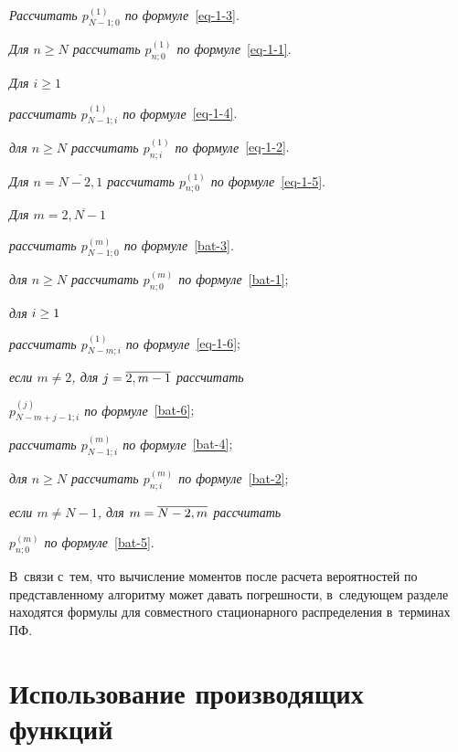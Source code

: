 \begin{multicols}{2}
\noindent
\textit{Рассчитать $p^{(1)}_{N-1;0}$ по формуле}~\eqref{eq-1-3}.

\noindent
\textit{Для $n\ge N$ рассчитать $p^{(1)}_{n;0}$ по
формуле}~\eqref{eq-1-1}.

\noindent
\textit{Для $i\ge1$}


\textit{рассчитать $p^{(1)}_{N-1;i}$ по формуле}~\eqref{eq-1-4}.

\textit{для $n\ge N$ рассчитать $p^{(1)}_{n;i}$ по формуле}~\eqref{eq-1-2}.

\noindent
\textit{Для $n=\overline{N-2,1}$ рассчитать $p^{(1)}_{n;0}$
по формуле}~\eqref{eq-1-5}.

\noindent
\textit{Для $m=\overline{2,N-1}$}

\textit{рассчитать $p^{(m)}_{N-1;0}$ по формуле}~\eqref{bat-3}.


\textit{для $n\ge N$ рассчитать $p^{(m)}_{n;0}$
   по формуле}~\eqref{bat-1};

\textit{для} $i\hm\ge1$

    \hspace*{9pt}\textit{рассчитать $p^{(1)}_{N-m;i}$ по
    формуле}~\eqref{eq-1-6};


    \hspace*{9pt}\textit{если $m \ne 2$, для}  $j\hm=\overline{2,m-1}$ \textit{рассчитать}\linebreak\vspace*{-12pt}

 \hspace*{9pt}\textit{$p^{(j)}_{N-m+j-1;i}$ по формуле}~\eqref{bat-6};

\hspace*{9pt}\textit{рассчитать $p^{(m)}_{N-1;i}$ по формуле}~\eqref{bat-4};

\hspace*{9pt}\textit{для $n\ge N$ рассчитать $p^{(m)}_{n;i}$
    по формуле}~\eqref{bat-2};

\textit{если {$m \ne N-1$}, для $m\hm=\overline{N-2,m}$
   рассчитать}\linebreak

   \textit{$p^{(m)}_{n;0}$ по формуле}~\eqref{bat-5}.

\bigskip

В~связи с~тем, что вычисление моментов после расчета
вероятностей по представленному алгоритму
может давать погрешности, в~следующем разделе
находятся формулы для совместного стационарного
распределения в~терминах ПФ.


\section{Использование производящих функций}


\end{multicols}
